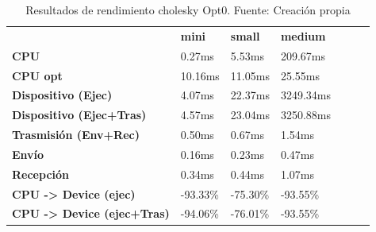 \begin{table}[H]
    \centering
    \begin{tabular}{lllllll}
    \rowcolor[HTML]{DAE8FC} \ &  \textbf{mini} &  \textbf{	small} &  \textbf{	medium} \\
    \cellcolor[HTML]{DAE8FC} \textbf{CPU} & 0.27ms & 	5.53ms & 	209.67ms \\
    \rowcolor[HTML]{EFEFEF} \cellcolor[HTML]{DAE8FC} \textbf{CPU opt} & 10.16ms & 	11.05ms & 	25.55ms \\
    \cellcolor[HTML]{DAE8FC} \textbf{Dispositivo (Ejec)} & 4.07ms & 	22.37ms & 	3249.34ms \\
    \rowcolor[HTML]{EFEFEF} \cellcolor[HTML]{DAE8FC} \textbf{Dispositivo (Ejec+Tras)} & 4.57ms & 	23.04ms & 	3250.88ms \\
    \cellcolor[HTML]{DAE8FC} \textbf{Trasmisión (Env+Rec)} & 0.50ms & 	0.67ms & 	1.54ms \\
    \rowcolor[HTML]{EFEFEF} \cellcolor[HTML]{DAE8FC} \textbf{Envío} & 0.16ms & 	0.23ms & 	0.47ms \\
    \cellcolor[HTML]{DAE8FC} \textbf{Recepción} & 0.34ms & 	0.44ms & 	1.07ms \\
    \rowcolor[HTML]{EFEFEF} \cellcolor[HTML]{DAE8FC} \textbf{CPU -> Device (ejec)} & -93.33\% & 	-75.30\% & 	-93.55\% \\
    \cellcolor[HTML]{DAE8FC} \textbf{CPU -> Device (ejec+Tras)} & -94.06\% & 	-76.01\% & 	-93.55\% \\
    \end{tabular}
    \caption[Resultados de rendimiento cholesky Opt0]{{Resultados de rendimiento cholesky Opt0. Fuente: Creación propia}}
    \label{table_test_cholesky_Opt0_hw_performanceResults}
\end{table}